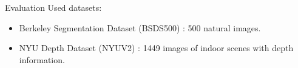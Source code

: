 \documentclass[handout]{beamer}
\begin{document}
	\begin{frame}{Evaluation}
		Used datasets:
		\vskip 0.25cm
		\begin{itemize}[label=--]
			\item Berkeley Segmentation Dataset (BSDS500) \cite{ArbelaezMaireFowlkesMalik:2011}: 500 natural images.
			\item NYU Depth Dataset (NYUV2) \cite{SilbermanHoiemKohliFergus:2012}: 1449 images of indoor scenes with depth information.
		\end{itemize}
		
		\begin{figure}
			\subfigure{
}
\end{figure}
\end{frame}
\end{document}
